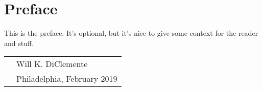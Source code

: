 \chapter{Preface}

This is the preface. It's optional, but it's nice to give some context for the reader and stuff.

\vspace{0.05\textheight}

\begin{tabular}{p{} l}
  & Will K. DiClemente           \\
  & Philadelphia, February 2019  \\
\end{tabular}

